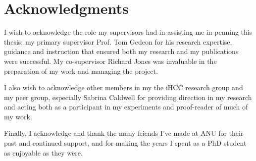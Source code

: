 \chapter*{Acknowledgments}
I wish to acknowledge the role my supervisors had in assisting me in penning
this thesis; my primary supervisor Prof. Tom Gedeon for his research expertise,
guidance and instruction that ensured both my research and my publications were
successful. My co-supervisor Richard Jones was invaluable in the preparation of
my work and managing the project. 

I also wish to acknowledge other members in my the iHCC research group and my
peer group, especially Sabrina Caldwell for providing direction in my research
and acting both as a participant in my experiments and proof-reader of much of
my work.

Finally, I acknowledge and thank the many friends I've made at ANU for their
past and continued support, and for making the years I spent as a PhD student as
enjoyable as they were.
